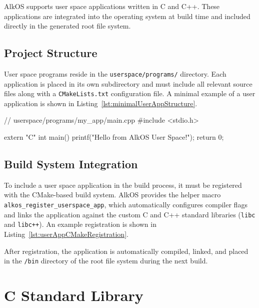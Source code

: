 \documentclass[a4paper,10pt,twoside]{report}
\theoremstyle{definition}
\begin{document}
AlkOS supports user space applications written in C and C++. These applications are integrated into the operating system at build time and included directly in the generated root file system.

\subsection{Project Structure}

User space programs reside in the \texttt{userspace/programs/} directory. Each application is placed in its own subdirectory and must include all relevant source files along with a \texttt{CMakeLists.txt} configuration file. A minimal example of a user application is shown in Listing~\ref{lst:minimalUserAppStructure}.

\begin{cppcode}[caption={Minimal User Application Structure}, label={lst:minimalUserAppStructure}]
// userspace/programs/my_app/main.cpp
#include <stdio.h>

extern "C" int main() {
    printf("Hello from AlkOS User Space!\n");
    return 0;
}
\end{cppcode}

\subsection{Build System Integration}

To include a user space application in the build process, it must be registered with the CMake-based build system. AlkOS provides the helper macro \texttt{alkos\_register\_userspace\_app}, which automatically configures compiler flags and links the application against the custom C and C++ standard libraries (\texttt{libc} and \texttt{libc++}). An example registration is shown in Listing~\ref{lst:userAppCMakeRegistration}.


After registration, the application is automatically compiled, linked, and placed in the \texttt{/bin} directory of the root file system during the next build.

\section{C Standard Library}
\end{document}

